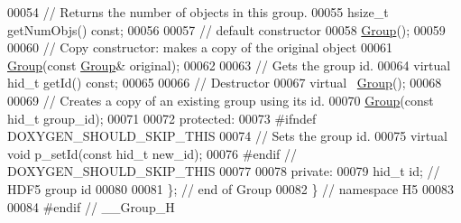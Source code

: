 \begin{DoxyCode}
00054         \textcolor{comment}{// Returns the number of objects in this group.}
00055         hsize\_t getNumObjs() \textcolor{keyword}{const};
00056 
00057         \textcolor{comment}{// default constructor}
00058         \hyperlink{class_h5_1_1_group}{Group}();
00059 
00060         \textcolor{comment}{// Copy constructor: makes a copy of the original object}
00061         \hyperlink{class_h5_1_1_group}{Group}(\textcolor{keyword}{const} \hyperlink{class_h5_1_1_group}{Group}& original);
00062 
00063         \textcolor{comment}{// Gets the group id.}
00064         \textcolor{keyword}{virtual} hid\_t getId() \textcolor{keyword}{const};
00065 
00066         \textcolor{comment}{// Destructor}
00067         \textcolor{keyword}{virtual} ~\hyperlink{class_h5_1_1_group}{Group}();
00068 
00069         \textcolor{comment}{// Creates a copy of an existing group using its id.}
00070         \hyperlink{class_h5_1_1_group}{Group}(\textcolor{keyword}{const} hid\_t group\_id);
00071 
00072    \textcolor{keyword}{protected}:
00073 \textcolor{preprocessor}{#ifndef DOXYGEN\_SHOULD\_SKIP\_THIS}
00074         \textcolor{comment}{// Sets the group id.}
00075         \textcolor{keyword}{virtual} \textcolor{keywordtype}{void} p\_setId(\textcolor{keyword}{const} hid\_t new\_id);
00076 \textcolor{preprocessor}{#endif // DOXYGEN\_SHOULD\_SKIP\_THIS}
00077 
00078    \textcolor{keyword}{private}:
00079         hid\_t id;    \textcolor{comment}{// HDF5 group id}
00080 
00081 \}; \textcolor{comment}{// end of Group}
00082 \} \textcolor{comment}{// namespace H5}
00083 
00084 \textcolor{preprocessor}{#endif // \_\_Group\_H}
\end{DoxyCode}
